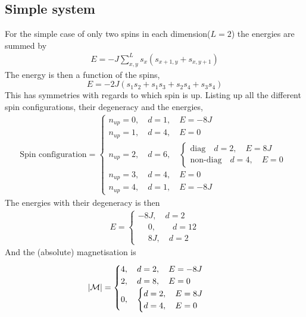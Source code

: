 \documentclass[11pt,a4paper,english]{article}
\numberwithin{equation}{section}
\newcommand{\magM}{\mathcal{M}}
\begin{document}
\subsection{Simple system}
For the simple case of only two spins in each dimension($L=2$)
the energies are summed by
\begin{gather}
E = -J\sum_{x,y}^{L} s_x (s_{x+1,y} + s_{x,y+1})
\end{gather}
The energy is then a function of the spins,
\begin{equation}
E = -2J(s_1s_2 + s_1s_3 + s_2s_4 + s_3s_4)
\end{equation}
This has symmetries with regards to which spin is up.
Listing up all the different spin configurations, their degeneracy 
and the energies,
\begin{gather*}
\text{Spin configuration} = 
\begin{cases}
n_{up} = 0, \quad d=1, \quad E = -8J\\
n_{up} = 1, \quad d=4, \quad E = 0\\
n_{up} = 2, \quad d=6, \quad 
\begin{cases} 
\text{diag} \quad d = 2, \quad E = 8J\\
\text{non-diag} \quad d = 4, \quad E = 0
\end{cases}\\
n_{up} = 3, \quad d=4, \quad E = 0\\
n_{up} = 4, \quad d=1, \quad E = -8J
\end{cases}
\end{gather*}
The energies with their degeneracy is then
\begin{gather}
E = 
\begin{cases}
-8J, \quad d = 2\\
\phantom{-}0, \quad\quad d = 12\\
\phantom{-}8J, \quad d = 2
\end{cases}
\end{gather}
And the (absolute) magnetisation is
\begin{gather}
\abs{\magM} = 
\begin{cases}
4, \quad d = 2,\quad E = -8J\\
2, \quad d = 8, \quad E = 0\\
0, \quad
\begin{cases}
d = 2, \quad E = 8J\\
d = 4, \quad E = 0
\end{cases}
\end{cases}
\end{gather}
\end{document}
